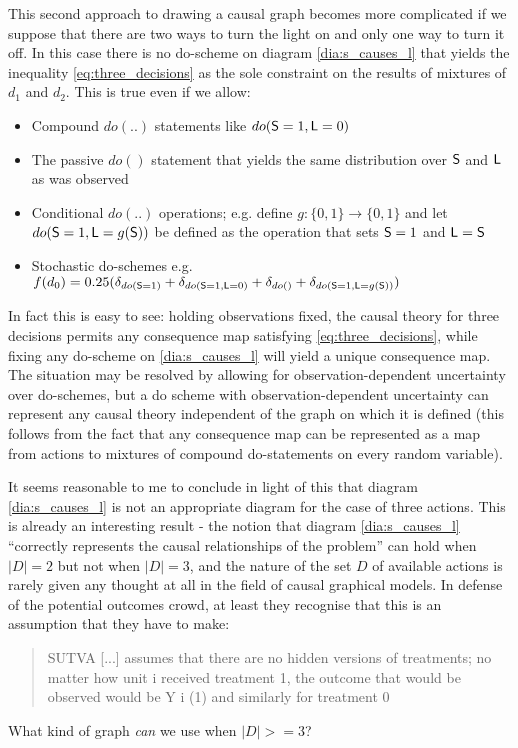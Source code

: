 This second approach to drawing a causal graph becomes more complicated if we suppose that there are two ways to turn the light on and only one way to turn it off. In this case there is no do-scheme on diagram \ref{dia:s_causes_l} that yields the inequality \ref{eq:three_decisions} as the sole constraint on the results of mixtures of $d_1$ and $d_2$. This is true even if we allow:
\begin{itemize}
	\item Compound $do(..)$ statements like $do(\mathsf{S}=1,\mathsf{L}=0)$
	\item The passive $do()$ statement that yields the same distribution over $\mathsf{S}$ and $\mathsf{L}$ as was observed
	\item Conditional $do(..)$ operations; e.g. define $g:\{0,1\}\to \{0,1\}$ and let $do(\mathsf{S}=1,\mathsf{L}=g(\mathsf{S}))$ be defined as the operation that sets $\mathsf{S}=1$ and $\mathsf{L}=\mathsf{S}$ 
	\item Stochastic do-schemes e.g. $f(d_0) = 0.25(\delta_{do(\mathsf{S}=1)} + \delta_{do(\mathsf{S}=1,\mathsf{L}=0)} + \delta_{do()} + \delta_{do(\mathsf{S}=1,\mathsf{L}=g(\mathsf{S}))})$
\end{itemize}
In fact this is easy to see: holding observations fixed, the causal theory for three decisions permits any consequence map satisfying \ref{eq:three_decisions}, while fixing any do-scheme on \ref{dia:s_causes_l} will yield a unique consequence map. The situation may be resolved by allowing for observation-dependent uncertainty over do-schemes, but a do scheme with observation-dependent uncertainty can represent any causal theory independent of the graph on which it is defined (this follows from the fact that any consequence map can be represented as a map from actions to mixtures of compound do-statements on every random variable).

It seems reasonable to me to conclude in light of this that diagram \ref{dia:s_causes_l} is not an appropriate diagram for the case of three actions. This is already an interesting result - the notion that diagram \ref{dia:s_causes_l} ``correctly represents the causal relationships of the problem'' can hold when $|D|=2$ but not when $|D|=3$, and the nature of the set $D$ of available actions is rarely given any thought at all in the field of causal graphical models. In defense of the potential outcomes crowd, at least they recognise that this is an assumption that they have to make: 

\begin{quote}
 SUTVA [...] assumes that there are no hidden versions of treatments; no matter how unit i received treatment 1, the outcome that would be observed would be Y i (1) and similarly for treatment 0 \citep{rubin_causal_2005}
\end{quote}


What kind of graph \emph{can} we use when $|D|>=3$?